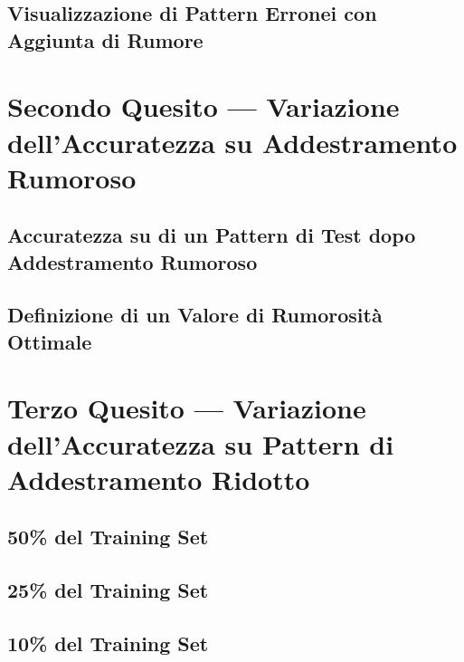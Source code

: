 \documentclass[12pt, a4paper]{article}
\begin{document}
\subsection{Visualizzazione di Pattern Erronei con Aggiunta di Rumore}

\newpage
\section{Secondo Quesito --- Variazione dell'Accuratezza su Addestramento Rumoroso}
\subsection{Accuratezza su di un Pattern di Test dopo Addestramento Rumoroso}
\subsection{Definizione di un Valore di Rumorosità Ottimale}

\newpage
\section{Terzo Quesito --- Variazione dell'Accuratezza su Pattern di Addestramento Ridotto}
\subsection{50\% del Training Set}
\subsection{25\% del Training Set}
\subsection{10\% del Training Set}
\end{document}
